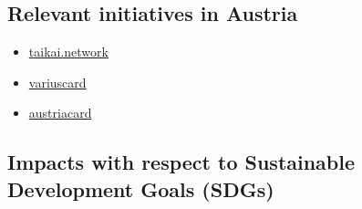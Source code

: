 \documentclass[
]{book}
\providecommand{\tightlist}{%
  \setlength{\itemsep}{0pt}\setlength{\parskip}{0pt}}
\begin{document}
\hypertarget{relevant-initiatives-in-austria-4}{%
\subsection*{Relevant initiatives in Austria}\label{relevant-initiatives-in-austria-4}}

\begin{itemize}
\tightlist
\item
  \href{https://taikai.network/en/wiener-linien/challenges/tickethon}{taikai.network}
\item
  \href{https://www.variuscard.com/}{variuscard}
\item
  \href{https://www.austriacard.com/}{austriacard}
\end{itemize}

\hypertarget{impacts-with-respect-to-sustainable-development-goals-sdgs-4}{%
\subsection*{Impacts with respect to Sustainable Development Goals (SDGs)}\label{impacts-with-respect-to-sustainable-development-goals-sdgs-4}}
\end{document}
